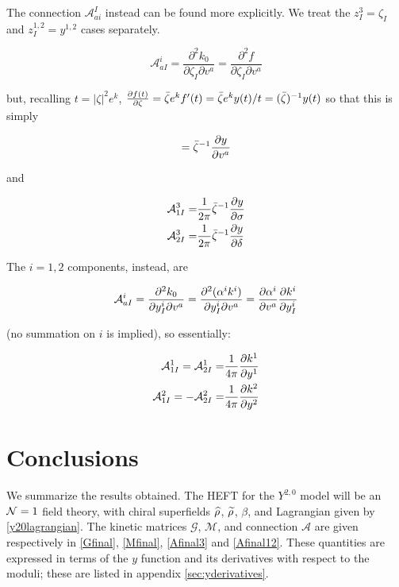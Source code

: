 The connection $\mathcal{A}_{ai}^I$ instead can be found more explicitly. We treat the $z_I^3 = \zeta_I$ and $z_I^{1,2} = y^{1,2}$ cases separately.

\begin{equation}
	\mathcal{A}_{aI}^i = \frac{\partial^2 k_0}{\partial \zeta_I \partial v^a} = \frac{\partial^2 f}{\partial \zeta_I \partial v^a}
	\label{}
\end{equation}

but, recalling $t = |\zeta|^2 e^k$, $\frac{\partial f(t)}{\partial\zeta} = \bar \zeta e^k f'(t) =\bar \zeta e^k y(t)/t = (\bar \zeta)^{-1} y(t)$ so that this is simply

\begin{equation}
	= \bar \zeta^{-1} \frac{\partial y}{\partial v^a}	\label{}
\end{equation}

and

\begin{align}
	\mathcal{A}_{1I}^3 =& \frac{1}{2\pi} \bar \zeta^{-1} \frac{\partial y}{\partial\sigma}\\
	\mathcal{A}_{2I}^3 =& \frac{1}{2\pi} \bar \zeta^{-1} \frac{\partial y}{\partial\delta}
	\label{Afinal3}
\end{align}

The $i=1,2$ components, instead, are

\begin{equation}
	\mathcal{A}_{aI}^i = \frac{\partial^2 k_0}{\partial y_I^i \partial v^a} = \frac{\partial^2 (\alpha^i k^i)}{\partial y_I^i \partial v^a}  = \frac{\partial\alpha^i}{\partial v^a} \frac{\partial k^i}{\partial y_I^i}
	\label{Afinal12}
\end{equation}

(no summation on $i$ is implied), so essentially:

\begin{align}
	\mathcal{A}_{1I}^1 = \mathcal{A}_{2I}^1 = & \frac{1}{4\pi} \frac{\partial k^1}{\partial y^1} \\
	\mathcal{A}_{1I}^2 = - \mathcal{A}_{2I}^2 = & \frac{1}{4\pi} \frac{\partial k^2}{\partial y^2} \\
	\label{}
\end{align}


\section{Conclusions}

We summarize the results obtained. The HEFT for the $Y^{2,0}$ model will be an $\mathcal{N} = 1$ field theory, with chiral superfields $\widehat{\rho}$, $\widetilde{\rho}$, $\beta$, and Lagrangian given by \eqref{y20lagrangian}. The kinetic matrices $\mathcal{G}$, $\mathcal{M}$, and connection $\mathcal{A}$ are given respectively in \eqref{Gfinal}, \eqref{Mfinal}, \eqref{Afinal3} and \eqref{Afinal12}. These quantities are expressed in terms of the $y$ function and its derivatives with respect to the moduli; these are listed in appendix \ref{sec:yderivatives}.


